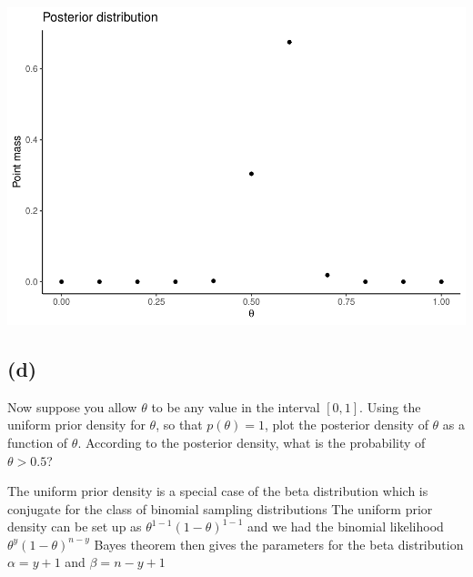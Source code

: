 \documentclass[
  10pt,
]{article}
\begin{document}
\includegraphics{Heimaverkefni-1_files/figure-latex/unnamed-chunk-2-1.pdf}

\hypertarget{d}{%
\subsection*{(d)}\label{d}}

Now suppose you allow \(\theta\) to be any value in the interval \([0,1]\). Using the uniform prior density for \(\theta\), so that \(p(\theta) = 1\), plot the posterior density of \(\theta\) as a function of \(\theta\). According to the posterior density, what is the probability of \(\theta > 0.5\)?

The uniform prior density is a special case of the beta distribution which is conjugate for the class of binomial sampling distributions
The uniform prior density can be set up as \(\theta^{1-1}(1-\theta)^{1-1}\) and we had the binomial likelihood \(\theta^y(1-\theta)^{n-y}\)
Bayes theorem then gives the parameters for the beta distribution \(\alpha = y+1\) and \(\beta = n-y+1\)
\end{document}
